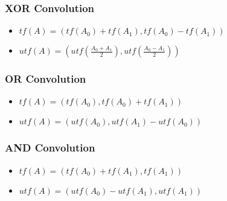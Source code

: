 \subsubsection{XOR Convolution}
\begin{itemize}
    \item $tf(A) = (tf(A_0) + tf(A_1), tf(A_0) - tf(A_1))$
    \item $utf(A) = (utf(\frac{A_0 + A_1}{2}), utf(\frac{A_0 - A_1}{2}))$
\end{itemize}
\subsubsection{OR Convolution}
\begin{itemize}
    \item $tf(A) = (tf(A_0), tf(A_0) + tf(A_1))$
    \item $utf(A) = (utf(A_0), utf(A_1) - utf(A_0))$
\end{itemize}
\subsubsection{AND Convolution}
\begin{itemize}
    \item $tf(A) = (tf(A_0) + tf(A_1), tf(A_1))$
    \item $utf(A) = (utf(A_0) - utf(A_1), utf(A_1))$
\end{itemize}
